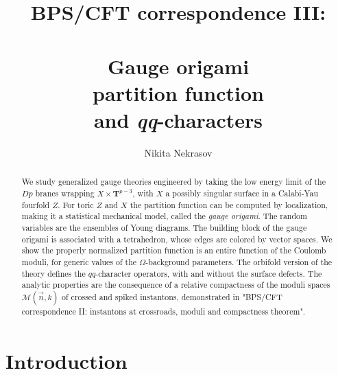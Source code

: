 \documentclass[12pt]{amsart}
\newcommand {\3}{\underline{\bf 3}}
\newcommand {\4}{\underline{\bf 4}}
\newcommand {\6}{\underline{\bf 6}}
\newcommand{\iM}{{\mathscr M}}
\newcommand {\bT}   {\mathbf{T}}
\newcommand{\secc}[1]{\section{$\mathbf{ #1}$}}
\begin{document}
\title[BPS/CFT, QQ-characters, Gauge origami]{BPS/CFT correspondence III:\\ \ \\  Gauge origami\\ partition function\\
and {\it qq}-characters}

\author{Nikita Nekrasov}

\address{Simons Center for Geometry and Physics\\
Stony Brook University, Stony Brook NY 11794-3636, USA
\\
Kharkevich Institute for Information Transmission Problems, Moscow 127051 Russia\\
E-mail: nikitastring@gmail.com}




\maketitle




\begin{abstract}
We study generalized gauge theories engineered by taking the low energy limit of the $Dp$ branes wrapping $X \times {\bT}^{p-3}$, with $X$ a possibly singular surface in a Calabi-Yau fourfold $Z$. For toric $Z$ and $X$ the partition function can be computed by localization, making it a statistical mechanical model, called the \emph{gauge origami}. The random variables are the ensembles of Young diagrams. The building block of the gauge origami is associated with a tetrahedron, whose edges are colored by vector spaces. We show the properly normalized partition function is an entire function of the Coulomb moduli, for generic values of the $\Omega$-background parameters. The orbifold version of the theory defines the $qq$-character operators, with and without the surface defects. 
The analytic properties are the consequence of a relative compactness of the moduli spaces ${\iM}({\vec n}, k)$
of crossed and spiked instantons, demonstrated in "BPS/CFT correspondence II: instantons at crossroads, moduli and compactness theorem". 

\end{abstract}

\setcounter{tocdepth}{2} 
\tableofcontents

\secc{ Introduction}\label{aba:sec1}
\end{document}
